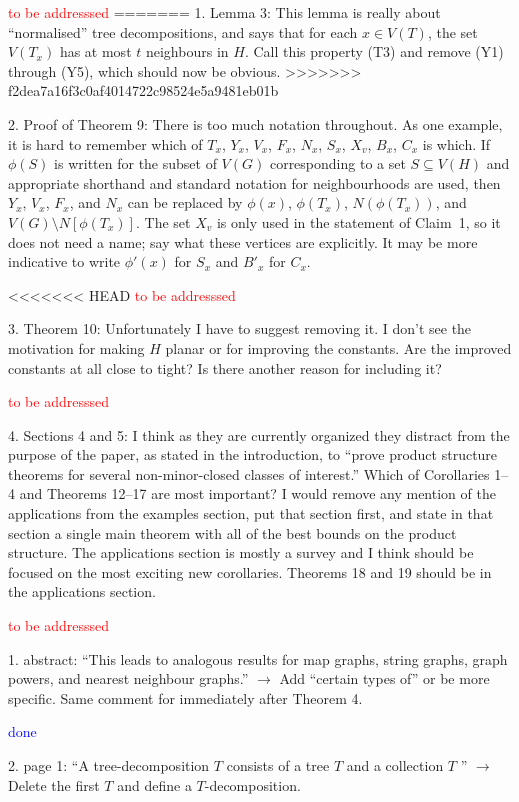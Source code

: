\documentclass[12pt]{article}
\newcommand{\done}{\textcolor{blue}{done}}
\newcommand{\tba}{\textcolor{red}{to be addresssed}}
\begin{document}
\tba
=======
1. Lemma 3: This lemma is really about “normalised” tree decompositions, and says that for each $x \in V(T)$, the set $V(T_x)$ has at most $t$ neighbours in $H$. Call this property (T3) and remove (Y1)  through (Y5), which should now be obvious.
>>>>>>> f2dea7a16f3c0af4014722c98524e5a9481eb01b

2. Proof of Theorem 9: There is too much notation throughout. As
one example, it is hard to remember which of $T_x$, $Y_x$, $V_x$, $F_x$, $N_x$,
$S_x$, $X_v$, $B_x$, $C_x$ is which. If $\phi(S)$ is written for the subset of $V(G)$
corresponding to a set $S \subseteq V(H)$ and appropriate shorthand and
standard notation for neighbourhoods are used, then $Y_x$, $V_x$, $F_x$, and
$N_x$ can be replaced by $\phi(x)$, $\phi(T_x)$, $N(\phi(T_x))$, and $V(G) \setminus N[\phi(T_x)]$.
The set $X_v$ is only used in the statement of Claim~1, so it does not
need a name; say what these vertices are explicitly. It may be more
indicative to write $\phi'(x)$ for $S_x$ and $B'_x$ for $C_x$.

<<<<<<< HEAD
\tba

3. Theorem 10: Unfortunately I have to suggest removing it. I don’t see
the motivation for making $H$ planar or for improving the constants.
Are the improved constants at all close to tight? Is there another
reason for including it?

\tba

4. Sections 4 and 5: I think as they are currently organized they distract from the purpose of the paper, as stated in the introduction, to ``prove product structure theorems for several non-minor-closed classes of interest.'' Which of Corollaries 1--4 and Theorems 12--17 are most important? I would remove any mention of the applications from the examples section, put that section first, and state in that section a single main theorem with all of the best bounds on the product structure. The applications section is mostly a survey and I think should be focused on the most exciting new corollaries. Theorems 18 and 19 should be in the applications section.

\tba

1. abstract: ``This leads to analogous results for map graphs, string graphs, graph powers, and nearest neighbour graphs.'' $\longrightarrow$ 
Add ``certain types of'' or be more specific. Same comment for immediately after Theorem 4.

\done

2. page 1: ``A tree-decomposition $T$ consists of a tree $T$ and a collection
$T$ '' $\longrightarrow$ Delete the first $T$ and define a $T$-decomposition.
\end{document}
